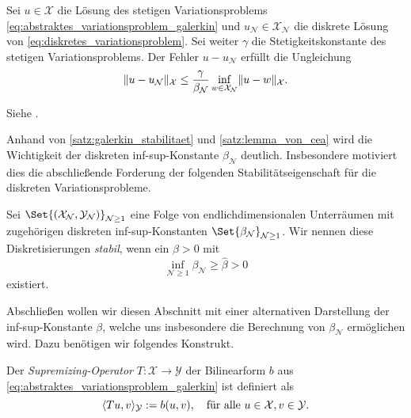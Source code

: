 \documentclass[../main.tex]{subfiles}
\begin{document}
\begin{Satz}
    \label{satz:lemma_von_cea}
    Sei $u \in \mathcal X$ die Lösung des stetigen Variationsproblems \cref{eq:abstraktes_variationsproblem_galerkin} und $u_{\mathcal N} \in \mathcal X_{\mathcal N}$ die diskrete Lösung von \cref{eq:diskretes_variationsproblem}.
    Sei weiter $\gamma$ die Stetigkeitskonstante des stetigen Variationsproblems.
    Der Fehler $u - u_{\mathcal N}$ erfüllt die Ungleichung
    \begin{equation}
        \label{eq:lemma_von_cea}
        \norm{u - u_{\mathcal N}}_{\mathcal X} \leq \frac{\gamma}{\beta_{\mathcal N}} \inf_{w \in \mathcal X_{\mathcal N}} \norm{u - w}_{\mathcal X}.
    \end{equation}

    \begin{Beweis}
        Siehe \cite[Theorem 3.2]{Nochetto:2009il}.
    \end{Beweis}
\end{Satz}

Anhand von \cref{satz:galerkin_stabilitaet} und \cref{satz:lemma_von_cea} wird die Wichtigkeit der diskreten inf-sup-Konstante $\beta_{\mathcal N}$ deutlich.
Insbesondere motiviert dies die abschließende Forderung der folgenden Stabilitätseigenschaft für die diskreten Variationsprobleme.

\begin{Definition}
\label{definition:stabile_diskretisierung}
    Sei $\Set{(\mathcal X_{\mathcal N}, \mathcal Y_{\mathcal N})}_{\mathcal N \geq 1}$ eine Folge von endlichdimensionalen Unterräumen mit zugehörigen diskreten inf-sup-Konstanten $\Set{\beta_{\mathcal N}}_{\mathcal N \geq 1}$.
    Wir nennen diese Diskretisierungen \emph{stabil}, wenn ein $\hat\beta > 0$ mit
    \begin{equation}
        \inf_{\mathcal N \geq 1} \beta_{\mathcal N} \geq \hat\beta > 0
    \end{equation}
    existiert.
\end{Definition}

Abschließen wollen wir diesen Abschnitt mit einer alternativen Darstellung der inf-sup-Konstante $\beta$, welche uns insbesondere die Berechnung von $\beta_{\mathcal N}$ ermöglichen wird.
Dazu benötigen wir folgendes Konstrukt.

\begin{Definition}
\label{definition:supremizing_operator}
    Der \emph{Supremizing-Operator} $T \colon \mathcal X \to \mathcal Y$ der Bilinearform $b$ aus \cref{eq:abstraktes_variationsproblem_galerkin} ist definiert als
    \begin{equation}
        \skp{Tu}{v}{\mathcal Y} := b(u, v), \quad \fa u \in \mathcal X, v \in \mathcal Y.
    \end{equation}
\end{Definition}
\end{document}
